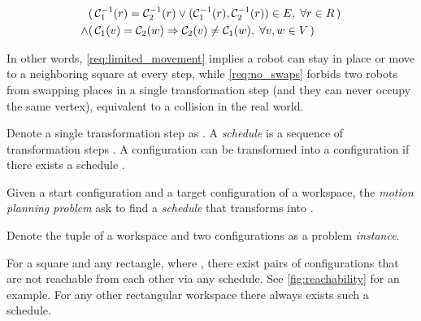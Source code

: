 \begin{align}
	& (\, \mathcal{C}_{1}^{-1}(r) = \mathcal{C}_{2}^{-1}(r) \lor (\mathcal{C}_{1}^{-1}(r), \mathcal{C}_{2}^{-1}(r)) \in E, \; \forall r \in R \,)\label{req:limited_movement}\\
	\land & (\, \mathcal{C}_{1}(v) = \mathcal{C}_{2}(w) \Rightarrow \mathcal{C}_{2}(v) \neq \mathcal{C}_{1}(w), \; \forall v, w \in V \,)\label{req:no_swaps}
\end{align}

In other words, \cref{req:limited_movement} implies  a robot can stay in place or move to a neighboring square at every step, while \cref{req:no_swaps} forbids two robots from swapping places in a single transformation step (and they can never occupy the same vertex), equivalent to a collision in the real world.

Denote a single transformation step as  . A \emph{schedule} is a sequence of transformation steps . A configuration  can be transformed into a configuration  if there exists a schedule .

\begin{definition}\label{def:motion_planning_problem}
	Given a start configuration  and a target configuration  of a workspace, the \emph{motion planning problem} ask  to find a \emph{schedule}  that transforms  into .
\end{definition}

Denote the tuple of a workspace and two configurations  as a problem \emph{instance}. 

\begin{remark}\label{remark:reachability}
	For a  square and any  rectangle, where , there exist pairs of configurations that are not reachable from each other via any schedule. See \cref{fig:reachability} for an example. For any other rectangular workspace there always exists such a schedule. 
\end{remark}


